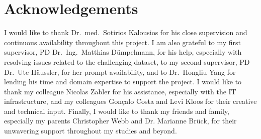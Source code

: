 \chapter*{Acknowledgements}

I would like to thank Dr.\ med.\ Sotirios Kalousios for his close supervision and continuous availability throughout this project.
I am also grateful to my first supervisor, PD Dr.\ Ing.\ Matthias Dümpelmann, for his help, especially with resolving issues related to the challenging dataset, to my second supervisor, PD Dr.\ Ute Häussler, for her prompt availability, and to Dr.\ Hongliu Yang for lending his time and domain expertise to support the project.
I would like to thank my colleague Nicolas Zabler for his assistance, especially with the IT infrastructure, and my colleagues Gonçalo Costa and Levi Kloos for their creative and technical input.
Finally, I would like to thank my friends and family, especially my parents Christopher Webb and Dr. Marianne Brück, for their unwavering support throughout my studies and beyond.